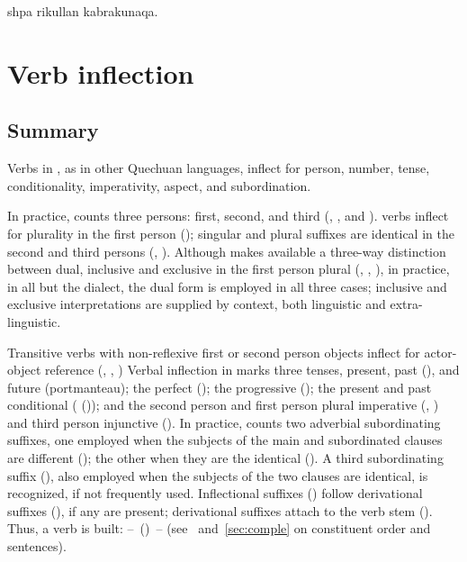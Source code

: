 %
{shpa rikullan kabrakunaqa.}%
{}%
{}{}%

\section{Verb inflection}
\subsection{Summary}\label{sec:verbs summary}
Verbs in \SYQ, as in other Quechuan languages, inflect for person, number, tense, conditionality, imperativity, aspect, and subordination. 

In practice, \SYQ{} counts three persons: first, second, and third (, , and ). \SYQ{} verbs inflect for plurality in the first person (); singular and plural suffixes are identical in the second and third persons (, ). Although \SYQ{} makes available a three-way distinction between dual, inclusive and exclusive in the first person plural (, , ), in practice, in all but the \CH{} dialect, the dual form is employed in all three cases; inclusive and exclusive interpretations are supplied by context, both linguistic and extra-linguistic. 

Transitive verbs with non-reflexive first or second person objects inflect for actor-object reference (, , \etc) Verbal inflection in \SYQ{} marks three tenses, present, past (), and future (portmanteau); the perfect (); the progressive (); the present and past conditional ( ()); and the second person and first person plural imperative (, ) and third person injunctive (). In practice, \SYQ{} counts two adverbial subordinating suffixes, one employed when the subjects of the main and subordinated clauses are different (); the other when they are the identical (). A third subordinating suffix (), also employed when the subjects of the two clauses are identical, is recognized, if not frequently used. Inflectional suffixes () follow derivational suffixes (), if any are present; derivational suffixes attach to the verb stem (). Thus, a \SYQ{} verb is built:  --~()~--  (see~ and~\ref{sec:comple} on constituent order and sentences).

